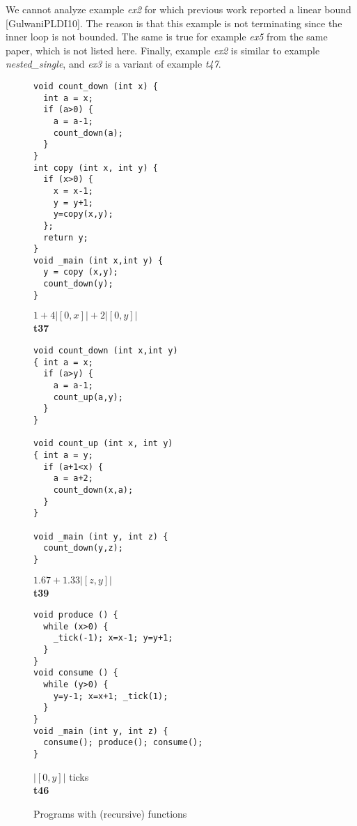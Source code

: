 \documentclass[nocopyrightspace,preprint]{sigplanconf}
\begin{document}
We cannot analyze example \emph{ex2} for which previous work reported
a linear bound [GulwaniPLDI10].  The reason is that this example is
not terminating since the inner loop is not bounded.  The same is true
for example \emph{ex5} from the same paper, which is not listed here.
Finally, example \emph{ex2} is similar to example
\emph{nested\_single}, and \emph{ex3} is a variant of example
\emph{t47}.

\begin{figure*}[t!]
 \setlength{\progwidth}{.28\linewidth}
  \centering
%
%
  \begin{minipage}[b]{\progwidth}
    \begin{center}
   \begin{lstlisting}
void count_down (int x) {
  int a = x;
  if (a>0) {
    a = a-1;
    count_down(a);
  }
}
int copy (int x, int y) {
  if (x>0) {
    x = x-1;
    y = y+1;
    y=copy(x,y);
  };
  return y;
}
void _main (int x,int y) {
  y = copy (x,y);
  count_down(y);
}
   \end{lstlisting}

$1 + 4|[0, x]| + 2|[0, y]|$
\\[.7\baselineskip]
      {\bf t37}
    \end{center}
  \end{minipage}
%
%
  \begin{minipage}[b]{\progwidth}
    \begin{center}
   \begin{lstlisting}
void count_down (int x,int y)
{ int a = x;
  if (a>y) {
    a = a-1;
    count_up(a,y);
  }
}

void count_up (int x, int y)
{ int a = y;
  if (a+1<x) {
    a = a+2;
    count_down(x,a);
  }
}

void _main (int y, int z) {
  count_down(y,z);
}
   \end{lstlisting}

$1.67 + 1.33 |[z,y]|$
\\[.7\baselineskip]
      {\bf t39}
    \end{center}
  \end{minipage}
%
%
  \begin{minipage}[b]{\progwidth}
    \begin{center}
   \begin{lstlisting}
void produce () {
  while (x>0) {
    _tick(-1); x=x-1; y=y+1;
  }
}
void consume () {
  while (y>0) {
    y=y-1; x=x+1; _tick(1);
  }
}
void _main (int y, int z) {
  consume(); produce(); consume();
}
   \end{lstlisting}

$|[0, y]|$ ticks
\\[.7\baselineskip]
      {\bf t46}
    \end{center}
  \end{minipage}

   \caption{Programs with (recursive) functions}
  \label{fig:cat3}
\end{figure*}
\end{document}
